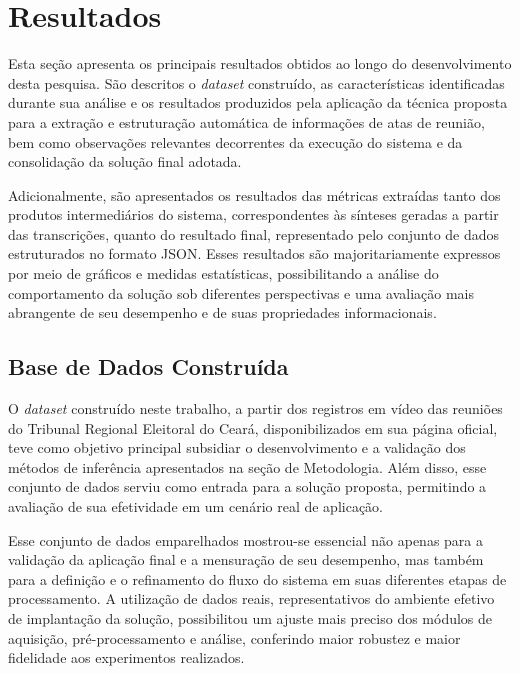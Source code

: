\chapter{Resultados}
\label{chap:resultados}

Esta seção apresenta os principais resultados obtidos ao longo do desenvolvimento desta pesquisa. São descritos o \textit{dataset} construído, as características identificadas durante sua análise e os resultados produzidos pela aplicação da técnica proposta para a extração e estruturação automática de informações de atas de reunião, bem como observações relevantes decorrentes da execução do sistema e da consolidação da solução final adotada.

Adicionalmente, são apresentados os resultados das métricas extraídas tanto dos produtos intermediários do sistema, correspondentes às sínteses geradas a partir das transcrições, quanto do resultado final, representado pelo conjunto de dados estruturados no formato JSON. Esses resultados são majoritariamente expressos por meio de gráficos e medidas estatísticas, possibilitando a análise do comportamento da solução sob diferentes perspectivas e uma avaliação mais abrangente de seu desempenho e de suas propriedades informacionais.

\section{Base de Dados Construída}
\label{sec:base-de-dados-construida}

O \textit{dataset} construído neste trabalho, a partir dos registros em vídeo das reuniões do Tribunal Regional Eleitoral do Ceará, disponibilizados em sua página oficial, teve como objetivo principal subsidiar o desenvolvimento e a validação dos métodos de inferência apresentados na seção de Metodologia. Além disso, esse conjunto de dados serviu como entrada para a solução proposta, permitindo a avaliação de sua efetividade em um cenário real de aplicação.

Esse conjunto de dados emparelhados mostrou-se essencial não apenas para a validação da aplicação final e a mensuração de seu desempenho, mas também para a definição e o refinamento do fluxo do sistema em suas diferentes etapas de processamento. A utilização de dados reais, representativos do ambiente efetivo de implantação da solução, possibilitou um ajuste mais preciso dos módulos de aquisição, pré-processamento e análise, conferindo maior robustez e maior fidelidade aos experimentos realizados.

